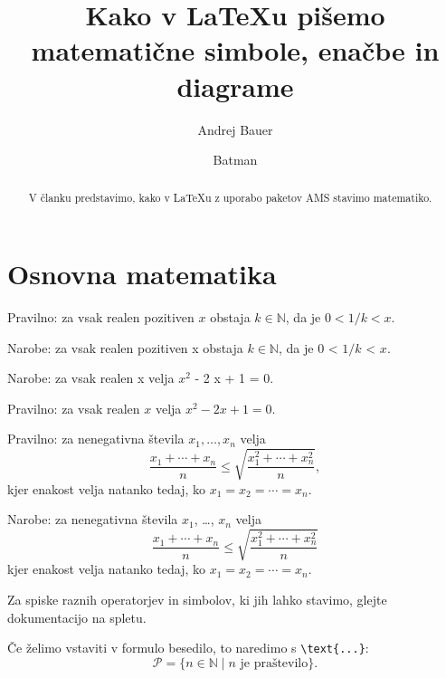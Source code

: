 \documentclass{amsart}
\title[Matematika v {\LaTeX}u]{Kako v {\LaTeX}u pišemo matematične simbole, enačbe in diagrame}
\author{Andrej Bauer}
\author{Batman}
\begin{document}
\maketitle

\begin{abstract}
  V članku predstavimo, kako v {\LaTeX}u z uporabo paketov AMS stavimo matematiko.
\end{abstract}

\section{Osnovna matematika}

Pravilno: za vsak realen pozitiven $x$ obstaja $k \in \mathbb{N}$, da je $0 < 1/k < x$.

Narobe: za vsak realen pozitiven x obstaja $k \in \mathbb{N}$, da je $0$ < $1/k$ < $x$.

Narobe: za vsak realen x velja $x^2$ - 2 x + 1 = 0.

Pravilno: za vsak realen $x$ velja $x^2 - 2 x + 1 = 0$.



Pravilno: za nenegativna števila $x_1, \ldots, x_n$ velja
%
\[
  \frac{x_1 + \cdots + x_n}{n} \leq
  \sqrt{\frac{x_1^2 + \cdots + x_n^2}{n}},
\]
%
kjer enakost velja natanko tedaj, ko $x_1 = x_2 = \cdots = x_n$.

Narobe: za nenegativna števila $x_1$, \dots, $x_n$ velja
\[
  \frac{x_1 + \cdots + x_n}{n} \leq
  \sqrt{\frac{x_1^2 + \cdots + x_n^2}{n}}
\]
kjer enakost velja natanko tedaj, ko $x_1 = x_2 = \cdots = x_n$.

Za spiske raznih operatorjev in simbolov, ki jih lahko stavimo, glejte dokumentacijo na
spletu.

Če želimo vstaviti v formulo besedilo, to naredimo s \verb|\text{...}|:
%
\begin{equation*}
  \mathcal{P} = \{ n \in \mathbb{N} \mid \text{$n$ je praštevilo} \}.
\end{equation*}
\end{document}
